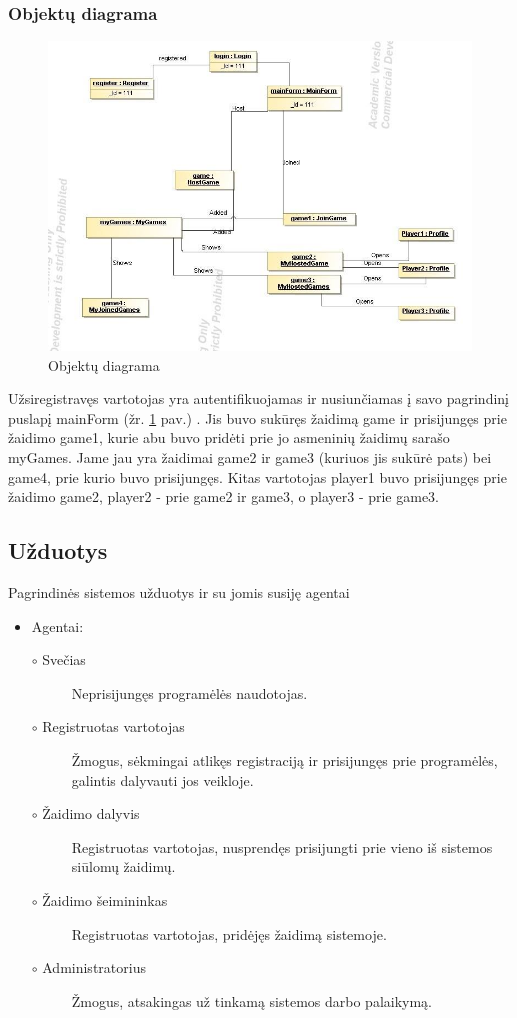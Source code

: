 \documentclass{VUMIFPSkursinis}
\begin{document}
	\subsubsection{Objektų diagrama}
		\begin{figure}[H]
				\centering
				\includegraphics[scale=0.5]{img/Object}
				\caption{Objektų diagrama}
				\label{img:Object}
			\end{figure}
		Užsiregistravęs vartotojas yra autentifikuojamas ir nusiunčiamas į savo pagrindinį puslapį mainForm (žr. \ref{img:Object} pav.) . Jis buvo sukūręs žaidimą game ir prisijungęs prie žaidimo game1, kurie abu buvo pridėti prie jo asmeninių žaidimų sarašo myGames. Jame jau yra žaidimai game2 ir game3 (kuriuos jis sukūrė pats) bei game4, prie kurio buvo prisijungęs. Kitas vartotojas player1 buvo prisijungęs prie žaidimo game2, player2 - prie game2 ir game3, o player3 - prie game3.

\subsection{Užduotys}
Pagrindinės sistemos užduotys ir su jomis susiję agentai

	\renewcommand{\labelitemi}{$\bullet$}
	\renewcommand{\labelitemii}{$\circ$}
	\begin{itemize}
		\item Agentai:
			\begin{description}
				\item [$\circ$ Svečias] Neprisijungęs programėlės naudotojas.
				\item [$\circ$ Registruotas vartotojas] Žmogus, sėkmingai atlikęs registraciją ir prisijungęs prie programėlės, galintis dalyvauti jos veikloje.
				\item [$\circ$ Žaidimo dalyvis] Registruotas vartotojas, nusprendęs prisijungti prie vieno iš sistemos siūlomų žaidimų.
				\item [$\circ$ Žaidimo šeimininkas] Registruotas vartotojas, pridėjęs žaidimą sistemoje.
				\item [$\circ$ Administratorius] Žmogus, atsakingas už tinkamą sistemos darbo palaikymą.
			\end{description}
	\end{itemize}
		
\end{document}
